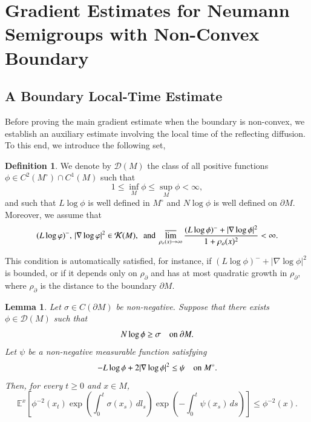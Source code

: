 \documentclass[11pt,twoside, reqno]{article}
\def\r{\right}
\def\l{\left}
\newcommand\1{\mathbbm{1}}
\newtheorem{lemma}[theorem]{Lemma}
\theoremstyle{definition}
\newtheorem{definition}[theorem]{Definition}
\numberwithin{equation}{section}
\begin{document}
\section{Gradient Estimates for Neumann Semigroups with Non-Convex Boundary}


\subsection{A Boundary Local-Time Estimate}



Before proving the main gradient estimate when the boundary is non-convex, we establish an auxiliary estimate involving the local time of the reflecting diffusion.  To this end, we introduce the following set,

\begin{definition}\label{def-DM}
We denote by \(\mathcal D(M)\) the class of all positive functions
\(\phi\in C^2(M^\circ)\cap C^1(M)\) such that
\[
        1\leq \inf_M\phi\leq \sup_M\phi<\infty,
\]
and such that \(L\log\phi\) is well defined in \(M^\circ\) and
\(N\log\phi\) is well defined on \(\partial M\). Moreover, we assume that
\[
        (L\log\varphi)^-, \, |\nabla\log\varphi|^2\in\mathcal K(M),\ \ \mbox{and}
\ \displaystyle
\varlimsup_{\rho_o(x)\to\infty}
\frac{(L\log\phi)^-+|\nabla\log\phi|^2}{1+\rho_o(x)^2}<\infty.
\]
\end{definition}
  This condition is automatically satisfied, for instance, if
\((L\log\phi)^-+|\nabla\log\phi|^2\) is bounded, or if it depends only on
\(\rho_{\partial}\) and has at most quadratic growth in
\(\rho_{\partial}\), where $\rho_{\partial}$ is the distance to the boundary $\partial M$. 

\begin{lemma}\label{lem-local-time}
Let \(\sigma\in C(\partial M)\) be non-negative. Suppose that there exists
\(\phi\in\mathcal D(M)\) such that
\[
        N\log\phi\geq \sigma
        \quad \hbox{on } \partial M .
\]
Let \(\psi\) be a non-negative measurable function satisfying
\[
        -L\log\phi+2|\nabla\log\phi|^2\leq \psi
        \quad \hbox{on } M^\circ .
\]
Then, for every \(t\geq0\) and \(x\in M\),
\[
\mathbb{E}^x \left[
\phi^{-2}(x_t)
\exp \left( \int_0^t \sigma(x_s)\,dl_s \right)
\exp \left( - \int_0^t \psi(x_s)\,ds \right)
\right]
\leq
\phi^{-2}(x).
\]
\end{lemma}
\end{document}
